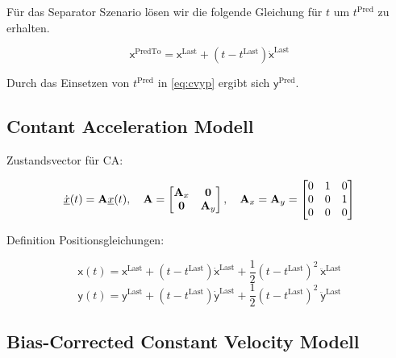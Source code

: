 Für das Separator Szenario lösen wir die folgende Gleichung für \(t\) um  \(t^{\text{Pred}}\) zu erhalten.

\begin{equation*}
    \mathsf{x}^{\text{PredTo}} = \mathsf{x}^{\text{Last}} + (t - t^{\text{Last}})\dot{\mathsf{x}}^{\text{Last}}
\end{equation*}

Durch das Einsetzen von \(t^{\text{Pred}}\) in \eqref{eq:cvyp} ergibt sich \(\mathsf{y}^{\text{Pred}}\).

\subsection{Contant Acceleration Modell}

Zustandsvector für CA:




\begin{align*} \label{eq:speedCV}
    \dot{{\underline{x}}}(t) = {{\mathbf{A}}}{\underline{x}}(t), \quad {\ensuremath{{\mathbf{A}}}} = 
    \begin{bmatrix}
        {\ensuremath{{\mathbf{A}}}}_x & \boldsymbol{0} \\
        \boldsymbol{0} & {{\mathbf{A}}}_y
    \end{bmatrix} 
    , \quad
    {\ensuremath{{\mathbf{A}}}}_x = {{\mathbf{A}}}_y = 
    \begin{bmatrix}
        0 & 1 & 0 \\
        0 & 0 & 1 \\
        0 & 0 & 0
    \end{bmatrix} 
\end{align*}

Definition Positionsgleichungen:

\begin{equation*}
    \mathsf{x}(t) = \mathsf{x}^{\text{Last}} + (t - t^{\text{Last}})\dot{\mathsf{x}}^{\text{Last}} 
    + \frac{1}{2} (t - t^{\text{Last}})^2 \: \ddot{\mathsf{x}}^{\text{Last}}
\end{equation*}
\begin{equation*}
    \mathsf{y}(t) = \mathsf{y}^{\text{Last}} + (t - t^{\text{Last}})\dot{\mathsf{y}}^{\text{Last}}
    + \frac{1}{2} (t - t^{\text{Last}})^2 \: \ddot{\mathsf{y}}^{\text{Last}}
\end{equation*}




\subsection{Bias-Corrected Constant Velocity Modell}

